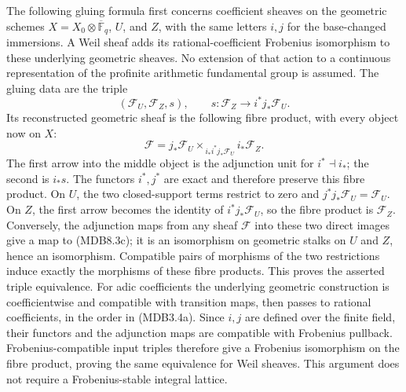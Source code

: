 \documentclass[
]{report}
\begin{document}
The following gluing formula first concerns coefficient sheaves on the
geometric schemes \(X=X_0\otimes\overline{\mathbb F}_q\), \(U\), and
\(Z\), with the same letters \(i,j\) for the base-changed immersions. A
Weil sheaf adds its rational-coefficient Frobenius isomorphism to these
underlying geometric sheaves. No extension of that action to a
continuous representation of the profinite arithmetic fundamental group
is assumed. The gluing data are the triple \[
(\mathcal F_U,\mathcal F_Z,s),
\qquad
s:\mathcal F_Z\longrightarrow i^*j_*\mathcal F_U.
\tag{MDB8.3b}
\] Its reconstructed geometric sheaf is the following fibre product,
with every object now on \(X\): \[
\mathcal F=
j_*\mathcal F_U
\times_{\,i_*i^*j_*\mathcal F_U}
i_*\mathcal F_Z.
\tag{MDB8.3c}
\] The first arrow into the middle object is the adjunction unit for
\(i^*\dashv i_*\); the second is \(i_*s\). The functors \(i^*,j^*\) are
exact and therefore preserve this fibre product. On \(U\), the two
closed-support terms restrict to zero and
\(j^*j_*\mathcal F_U=\mathcal F_U\). On \(Z\), the first arrow becomes
the identity of \(i^*j_*\mathcal F_U\), so the fibre product is
\(\mathcal F_Z\). Conversely, the adjunction maps from any sheaf
\(\mathcal F\) into these two direct images give a map to (MDB8.3c); it
is an isomorphism on geometric stalks on \(U\) and \(Z\), hence an
isomorphism. Compatible pairs of morphisms of the two restrictions
induce exactly the morphisms of these fibre products. This proves the
asserted triple equivalence. For adic coefficients the underlying
geometric construction is coefficientwise and compatible with transition
maps, then passes to rational coefficients, in the order in (MDB3.4a).
Since \(i,j\) are defined over the finite field, their functors and the
adjunction maps are compatible with Frobenius pullback.
Frobenius-compatible input triples therefore give a Frobenius
isomorphism on the fibre product, proving the same equivalence for Weil
sheaves. This argument does not require a Frobenius-stable integral
lattice.
\end{document}

